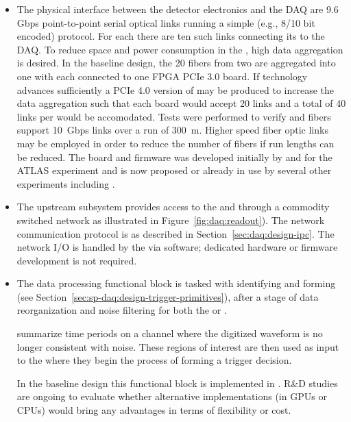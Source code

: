 \begin{itemize}
  
  \item The physical interface between the detector electronics and the DAQ are 9.6 Gbps
point-to-point serial optical links running a simple (e.g., 8/10 bit encoded) protocol.  For each
 there are ten such links connecting its  to the DAQ. To reduce space and
power consumption in the , high data aggregation is desired. In the baseline design, the
20 fibers from two  are aggregated into one  with each  connected
to one  FPGA PCIe 3.0 board.  If technology advances sufficiently a PCIe 4.0 version of
 may be produced to increase the data aggregation such that each board would accept 20
links and a total of 40 links per  would be accomodated. Tests were performed to verify
 and  fibers support \SI{10}{Gbps} links over a run of \SI{300}{\meter}.
Higher speed fiber optic links may be employed in order to reduce the number of fibers if run
lengths can be reduced. The  board and firmware was developed initially by and for the
ATLAS experiment and is now proposed or already in use by several other experiments including
.
  
  \item The upstream  subsystem provides access to the
 and  through a commodity switched network as
illustrated in Figure~\ref{fig:daq:readout}). The network communication
protocol is as described in Section~\ref{sec:daq:design-ipc}. The network I/O
is handled by the  via software; dedicated hardware or firmware
development is not required.

\item The data processing functional block is tasked with identifying and forming  (see
Section~\ref{sec:sp-daq:design-trigger-primitives}), after a stage of data
reorganization and noise filtering for both the  or . 

 summarize time periods on a channel where the digitized waveform is no longer consistent with noise.
These regions of interest are then used as input to the  where they begin the process of forming a trigger decision.

In the baseline design this functional block is implemented in .
R\&D studies are ongoing to evaluate whether alternative implementations (in GPUs or CPUs) would bring any advantages in terms of flexibility or cost.


\end{itemize}
